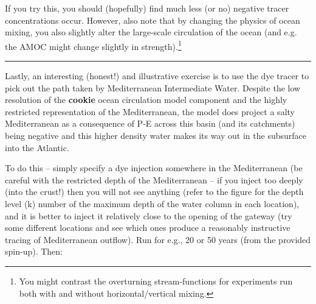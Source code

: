 \vspace{1mm}
If you try this, you should (hopefully) find much less (or no) negative tracer concentrations occur. However, also note that by changing the physics of ocean mixing, you also slightly alter the large-scale circulation of the ocean (and e.g. the AMOC might change slightly in strength).\footnote{You might contrast the overturning stream-functions for experiments run both with and without horizontal/vertical mixing.} 

\vspace{1mm}\noindent\rule{4cm}{0.5pt}\vspace{2mm}

\newpage

\noindent Lastly, an interesting (honest!) and illustrative exercise is to use the dye tracer to pick out the path taken by Mediterranean Intermediate Water. Despite the low resolution of the \textbf{cookie} ocean circulation model component and the highly restricted representation of the Mediterranean, the model does project a salty Mediterranean as a consequence of  P-E across this basin (and its catchments) being negative and this higher density water makes its way out in the subsurface into the Atlantic.

To do this -- simply specify a dye injection somewhere in the Mediterranean (be careful with the restricted depth of the Mediterranean – if you inject too deeply (into the crust!) then you will not see anything (refer to the figure for the depth level (k) number of the maximum depth of the water column in each location), and it is better to inject it relatively close to the opening of the gateway (try some different locations and see which ones produce a reasonably instructive tracing of Mediterranean outflow). Run for e.g., 20 or 50 years (from the provided spin-up). Then:

